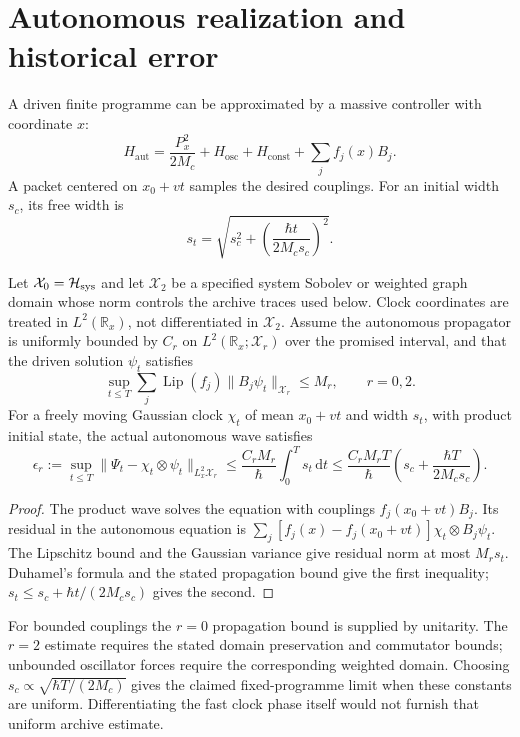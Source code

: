 \section{Autonomous realization and historical error}\label{section:massive:autonomous-realization-and-historical-error}
A driven finite programme can be approximated by a massive controller with coordinate $x$:
\[
H_{\mathrm{aut}}=\frac{P_x^2}{2M_c}+H_{\mathrm{osc}}+H_{\mathrm{const}}
+\sum_j f_j(x)B_j.
\]
A packet centered on $x_0+vt$ samples the desired couplings. For an initial width $s_c$, its free width is
\[
s_t=\sqrt{s_c^2+\left(\frac{\hbar t}{2M_cs_c}\right)^2}.
\]
\begin{proposition}\label{prop:clock-regularity}
Let $\mathcal X_0=\mathcal H_{\rm sys}$ and let $\mathcal X_2$ be a specified system Sobolev or weighted graph domain whose norm controls the archive traces used below. Clock coordinates are treated in $L^2(\mathbb R_x)$, not differentiated in $\mathcal X_2$. Assume the autonomous propagator is uniformly bounded by $C_r$ on $L^2(\mathbb R_x;\mathcal X_r)$ over the promised interval, and that the driven solution $\psi_t$ satisfies
\[
 \sup_{t\le T}\sum_j\operatorname{Lip}(f_j)
       \|B_j\psi_t\|_{\mathcal X_r}\le M_r,
 \qquad r=0,2.
\]
For a freely moving Gaussian clock $\chi_t$ of mean $x_0+vt$ and width $s_t$, with product initial state, the actual autonomous wave satisfies
\[
 \epsilon_r:=\sup_{t\le T}
 \|\Psi_t-\chi_t\otimes\psi_t\|_{L^2_x\mathcal X_r}
 \le \frac{C_rM_r}{\hbar}\int_0^T s_t\,\mathrm dt
 \le \frac{C_rM_rT}{\hbar}
 \left(s_c+\frac{\hbar T}{2M_cs_c}\right).
\]
\end{proposition}
\begin{proof}
The product wave solves the equation with couplings $f_j(x_0+vt)B_j$. Its residual in the autonomous equation is
$\sum_j[f_j(x)-f_j(x_0+vt)]\chi_t\otimes B_j\psi_t$.
The Lipschitz bound and the Gaussian variance give residual norm at most $M_rs_t$. Duhamel's formula and the stated propagation bound give the first inequality; $s_t\le s_c+\hbar t/(2M_cs_c)$ gives the second.
\end{proof}

For bounded couplings the $r=0$ propagation bound is supplied by unitarity. The $r=2$ estimate requires the stated domain preservation and commutator bounds; unbounded oscillator forces require the corresponding weighted domain. Choosing $s_c\propto\sqrt{\hbar T/(2M_c)}$ gives the claimed fixed-programme limit when these constants are uniform. Differentiating the fast clock phase itself would not furnish that uniform archive estimate.

